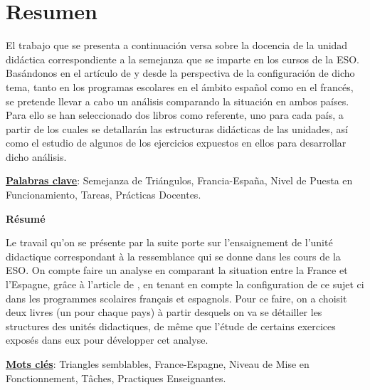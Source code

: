 \chapter*{\centering Resumen}

El trabajo que se presenta a continuación versa sobre la docencia de la unidad didáctica correspondiente a la semejanza que se imparte en los cursos de la ESO. Basándonos en el artículo de \citet{Horoks} y desde la perspectiva de la configuración de dicho tema, tanto en los programas escolares en el ámbito español como en el francés, se pretende llevar a cabo un análisis comparando la situación en ambos países. Para ello se han seleccionado dos libros como referente, uno para cada país, a partir de los cuales se detallarán las estructuras didácticas de las unidades, así como el estudio de algunos de los ejercicios expuestos en ellos para desarrollar dicho análisis. %

\underline{\textbf{Palabras clave}}: Semejanza de Triángulos, Francia-España, Nivel de Puesta en Funcionamiento, Tareas, Prácticas Docentes.%

\vspace{1.5cm}

\begin{center}
	\begin{Huge}
		\textbf{Résumé}
	\end{Huge}
\end{center}

\vspace{1cm}

Le travail qu'on se présente par la suite porte sur l'ensaignement de l'unité didactique correspondant à la ressemblance qui se donne dans les cours de la ESO. On compte faire un analyse en comparant la situation entre la France et l'Espagne, grâce à l'article de \cite{Horoks}, en tenant en compte la configuration de ce sujet ci dans les programmes scolaires français et espagnols. Pour ce faire, on a choisit deux livres (un pour chaque pays) à partir desquels on va se détailler les structures des unités didactiques, de même que l'étude de certains exercices exposés dans eux pour développer cet analyse.

\underline{\textbf{Mots clés}}: Triangles semblables, France-Espagne, Niveau de Mise en Fonctionnement, Tâches, Practiques Enseignantes.

